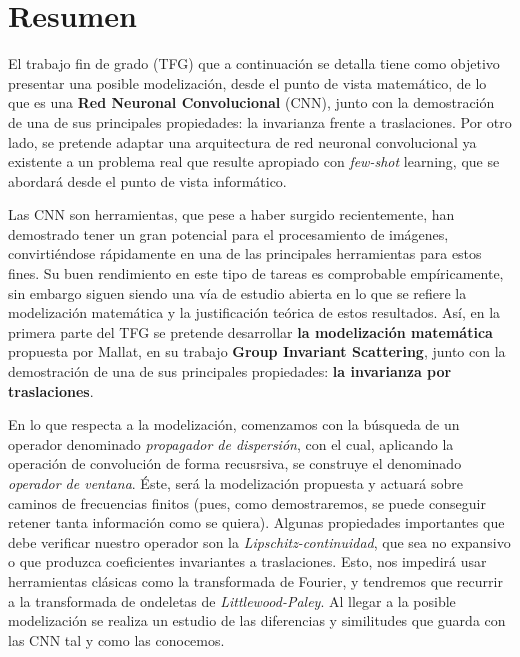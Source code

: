 %


\chapter{Resumen}

\noindent El trabajo fin de grado (TFG) que a continuación se detalla tiene como objetivo presentar una posible modelización, desde el punto de vista matemático, de lo que es una \textbf{Red Neuronal Convolucional} (CNN), junto con la demostración de una de sus principales propiedades: la invarianza frente a traslaciones. Por otro lado, se pretende adaptar una arquitectura de red neuronal convolucional ya existente a un problema real que resulte apropiado con \textit{few-shot} learning, que se abordará desde el punto de vista informático.

\medskip

\noindent Las CNN son herramientas, que pese a haber surgido recientemente, han demostrado tener un gran potencial para el procesamiento de imágenes, convirtiéndose rápidamente en una de las principales herramientas para estos fines. Su buen rendimiento en este tipo de tareas es comprobable empíricamente, sin embargo siguen siendo una vía de estudio abierta en lo que se refiere la modelización matemática y la justificación teórica de estos resultados. Así, en la primera parte del TFG se pretende desarrollar \textbf{la modelización matemática} propuesta por Mallat, en su trabajo \textbf{Group Invariant Scattering}, junto con la demostración de una de sus principales propiedades: \textbf{la invarianza por traslaciones}.

\medskip

\noindent En lo que respecta a la modelización, comenzamos con la búsqueda de un operador denominado \textit{propagador de dispersión}, con el cual,  aplicando la operación de convolución de forma recusrsiva, se construye el denominado \textit{operador de ventana}. Éste, será la modelización propuesta y actuará sobre caminos de frecuencias finitos (pues, como demostraremos, se puede conseguir retener tanta información como se quiera). Algunas propiedades importantes que debe verificar nuestro operador son la \textit{Lipschitz-continuidad}, que sea no expansivo o que produzca coeficientes invariantes a traslaciones. Esto, nos impedirá usar herramientas clásicas como la transformada de Fourier, y tendremos que recurrir a la transformada de ondeletas de \textit{Littlewood-Paley}. Al llegar a la posible modelización se realiza un estudio de las diferencias y similitudes que guarda con las CNN tal y como las conocemos.

